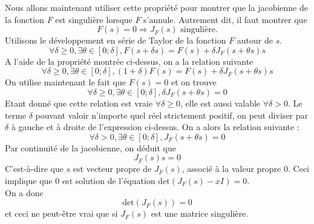 Nous allons maintenant utiliser cette propriété pour montrer que la jacobienne de la fonction $F$ est singulière lorsque $F$ s'annule. Autrement dit, il faut montrer que $$F(s) = 0 \Rightarrow J_{F}(s) \text{ singulière}.$$
Utilisons le développement en série de Taylor de la fonction $F$ autour de $s$.\\
$$\forall \delta \geq 0, \exists \theta \in [0;\delta], F(s+\delta s) = F(s) + \delta J_F(s+\theta s)s$$
A l'aide de la propriété montrée ci-dessus, on a la relation suivante  $$\forall \delta \geq 0, \exists \theta \in [0;\delta], (1+\delta)F(s) = F(s) + \delta J_F(s+\theta s)s$$
On utilise maintenant le fait que $F(s) = 0$ et on trouve $$\forall \delta \geq 0, \exists \theta \in [0;\delta], \delta J_F(s+\theta s) = 0$$
Etant donné que cette relation est vraie $\forall \delta \geq 0$, elle est aussi valable $\forall \delta > 0$. Le terme $\delta$ pouvant valoir n'importe quel réel strictement positif, on peut diviser par $\delta$ à gauche et à droite de l'expression ci-dessus. On a alors la relation suivante : $$\forall \delta > 0, \exists \theta \in [0;\delta], J_F(s+\theta s) = 0$$
Par continuité de la jacobienne, on déduit que $$J_F(s)s = 0$$
C'est-à-dire que $s$ est vecteur propre de $J_F(s)$, associé à la valeur propre $0$. Ceci implique que $0$ est solution de l'équation $\text{det}(J_F(s)-xI)=0$.\\
On a donc $$\text{det}(J_F(s))=0$$ et ceci ne peut-être vrai que si $J_F(s)$ est une matrice singulière.


